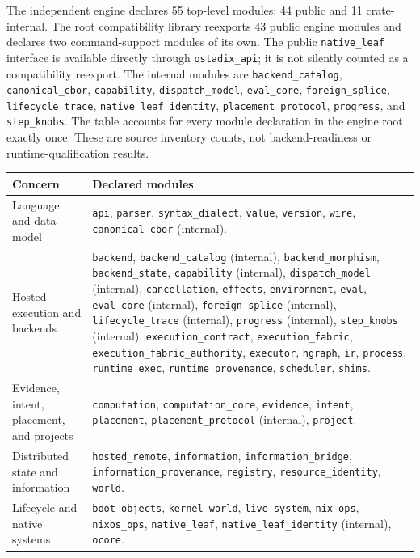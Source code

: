 \documentclass[11pt,oneside]{article}
\begin{document}
The independent engine declares 55 top-level modules: 44 public and 11
crate-internal. The root compatibility library reexports 43 public engine
modules and declares two command-support modules of its own. The public
\texttt{native\_leaf} interface is available directly through
\texttt{ostadix\_api}; it is not silently counted as a compatibility
reexport. The internal modules are \texttt{backend\_catalog},
\texttt{canonical\_cbor}, \texttt{capability}, \texttt{dispatch\_model},
\texttt{eval\_core}, \texttt{foreign\_splice}, \texttt{lifecycle\_trace},
\texttt{native\_leaf\_identity}, \texttt{placement\_protocol},
\texttt{progress}, and \texttt{step\_knobs}. The table accounts for every
module declaration in the engine root exactly once. These are source inventory
counts, not backend-readiness or runtime-qualification results.

\begin{longtable}{P{0.22\textwidth} P{0.70\textwidth}}
\toprule
\textbf{Concern} & \textbf{Declared modules} \\
\midrule
\endhead
Language and data model &
\texttt{api}, \texttt{parser}, \texttt{syntax\_dialect},
\texttt{value}, \texttt{version}, \texttt{wire},
\texttt{canonical\_cbor} (internal). \\
Hosted execution and backends &
\texttt{backend}, \texttt{backend\_catalog} (internal),
\texttt{backend\_morphism}, \texttt{backend\_state},
\texttt{capability} (internal), \texttt{dispatch\_model} (internal),
\texttt{cancellation}, \texttt{effects}, \texttt{environment}, \texttt{eval},
\texttt{eval\_core} (internal), \texttt{foreign\_splice} (internal),
\texttt{lifecycle\_trace} (internal), \texttt{progress} (internal),
\texttt{step\_knobs} (internal), \texttt{execution\_contract},
\texttt{execution\_fabric}, \texttt{execution\_fabric\_authority},
\texttt{executor}, \texttt{hgraph}, \texttt{ir}, \texttt{process},
\texttt{runtime\_exec}, \texttt{runtime\_provenance},
\texttt{scheduler}, \texttt{shims}. \\
Evidence, intent, placement, and projects &
\texttt{computation}, \texttt{computation\_core}, \texttt{evidence},
\texttt{intent}, \texttt{placement},
\texttt{placement\_protocol} (internal), \texttt{project}. \\
Distributed state and information &
\texttt{hosted\_remote}, \texttt{information},
\texttt{information\_bridge}, \texttt{information\_provenance},
\texttt{registry}, \texttt{resource\_identity}, \texttt{world}. \\
Lifecycle and native systems &
\texttt{boot\_objects}, \texttt{kernel\_world}, \texttt{live\_system}, \texttt{nix\_ops},
\texttt{nixos\_ops}, \texttt{native\_leaf},
\texttt{native\_leaf\_identity} (internal), \texttt{ocore}. \\
\bottomrule
\end{longtable}
\end{document}
